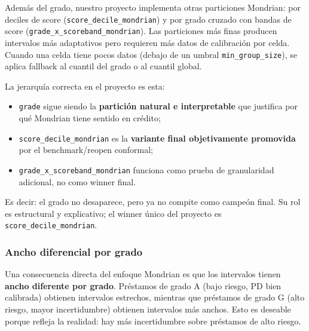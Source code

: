 \documentclass[
  spanish,
  11pt,
  letterpaper,
]{scrbook}
\providecommand{\tightlist}{%
  \setlength{\itemsep}{0pt}\setlength{\parskip}{0pt}}
\theoremstyle{plain}
\theoremstyle{remark}
\begin{document}
\begin{tcolorbox}[enhanced jigsaw, arc=.35mm, bottomrule=.15mm, bottomtitle=1mm, breakable, colback=white, colbacktitle=quarto-callout-tip-color!10!white, colframe=quarto-callout-tip-color-frame, coltitle=black, left=2mm, leftrule=.75mm, opacityback=0, opacitybacktitle=0.6, rightrule=.15mm, title=\textcolor{quarto-callout-tip-color}{\faLightbulb}\hspace{0.5em}{Particiones alternativas}, titlerule=0mm, toprule=.15mm, toptitle=1mm]

Además del grado, nuestro proyecto implementa otras particiones
Mondrian: por deciles de score (\texttt{score\_decile\_mondrian}) y por
grado cruzado con bandas de score
(\texttt{grade\_x\_scoreband\_mondrian}). Las particiones más finas
producen intervalos más adaptativos pero requieren más datos de
calibración por celda. Cuando una celda tiene pocos datos (debajo de un
umbral \texttt{min\_group\_size}), se aplica fallback al cuantil del
grado o al cuantil global.

La jerarquía correcta en el proyecto es esta:

\begin{itemize}
\tightlist
\item
  \texttt{grade} sigue siendo la \textbf{partición natural e
  interpretable} que justifica por qué Mondrian tiene sentido en
  crédito;
\item
  \texttt{score\_decile\_mondrian} es la \textbf{variante final
  objetivamente promovida} por el benchmark/reopen conformal;
\item
  \texttt{grade\_x\_scoreband\_mondrian} funciona como prueba de
  granularidad adicional, no como winner final.
\end{itemize}

Es decir: el grado no desaparece, pero ya no compite como campeón final.
Su rol es estructural y explicativo; el winner único del proyecto es
\texttt{score\_decile\_mondrian}.

\end{tcolorbox}

\subsubsection{Ancho diferencial por grado}\label{sec-mondrian-width}

Una consecuencia directa del enfoque Mondrian es que los intervalos
tienen \textbf{ancho diferente por grado}. Préstamos de grado A (bajo
riesgo, PD bien calibrada) obtienen intervalos estrechos, mientras que
préstamos de grado G (alto riesgo, mayor incertidumbre) obtienen
intervalos más anchos. Esto es deseable porque refleja la realidad: hay
más incertidumbre sobre préstamos de alto riesgo.
\end{document}
